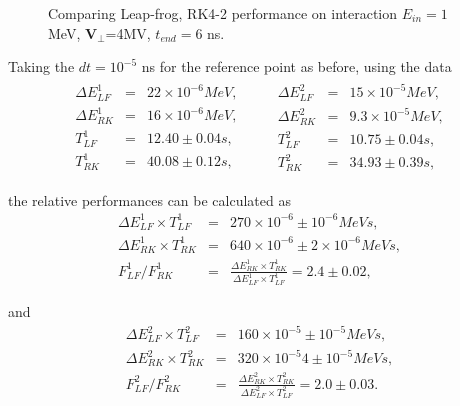\documentclass[a4paper,oneside,12pt]{report}
\numberwithin{equation}{chapter}
\begin{document}
{\begin{figure}[H]
    \vspace{5pt}
    \caption{Comparing Leap-frog, RK4-2 performance on \eE interaction $E_{in}=1$MeV, $\textbf{V}_{\perp}$=4MV, $t_{end}=6$ ns.}
    \label{fig:lf_rk2_perp_stat_E_comparison}
\end{figure}
Taking the $dt=10^{-5}$ ns for the reference point as before, using the data
\vspace{-15pt}\begin{eqnarray}
    \begin{aligned}
        \Delta E_{LF}^1 &=& 22 \times 10^{-6} MeV, \\
        \Delta E_{RK}^1 &=& 16 \times 10^{-6} MeV, \\
        T_{LF}^1 &=& 12.40 \pm 0.04 s, \\
        T_{RK}^1 &=& 40.08 \pm 0.12 s, 
    \end{aligned}
    \qquad
    \begin{aligned}
        \Delta E_{LF}^2 &=& 15 \times 10^{-5} MeV, \\
        \Delta E_{RK}^2 &=& 9.3 \times 10^{-5} MeV, \\
        T_{LF}^2 &=& 10.75 \pm 0.04 s, \\
        T_{RK}^2 &=& 34.93 \pm 0.39 s,  
    \end{aligned}
\end{eqnarray}

\vspace{-31pt}
\noindent
the relative performances can be calculated as
\vspace{-17pt}\begin{eqnarray} 
    \Delta E_{LF}^1 \times T_{LF}^1 &=& 270 \times 10^{-6} \pm 10^{-6} MeV s, \\ %
    \Delta E_{RK}^1 \times T_{RK}^1 &=& 640 \times 10^{-6} \pm 2\times 10^{-6}  MeV s, \\ %
    F_{LF}^1/F_{RK}^1 &=& \frac{\Delta E_{RK}^1 \times T_{RK}^1 }{\Delta E_{LF}^1 \times T_{LF}^1} = 2.4 \pm 0.02, \label{eq:f_lf_rk_1}
\end{eqnarray}

\vspace{-31pt}
\noindent
and
\vspace{-17pt}\begin{eqnarray}  
    \Delta E_{LF}^2 \times T_{LF}^2 &=& 160 \times 10^{-5} \pm 10^{-5} MeV s, \\ %
    \Delta E_{RK}^2 \times T_{RK}^2 &=& 320 \times 10^{-5} 4 \pm 10^{-5} MeV s, \\ %
    F_{LF}^2/F_{RK}^2 &=& \frac{\Delta E_{RK}^2 \times T_{RK}^2 }{\Delta E_{LF}^2 \times T_{LF}^2} = 2.0  \pm 0.03. \label{eq:f_lf_rk_2}
\end{eqnarray}

}
\end{document}
